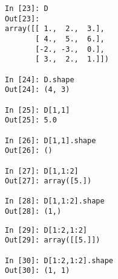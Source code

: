 \begin{center}
    \begin{minipage}{0.3\textwidth}
    \begin{verbatim}
In [23]: D
Out[23]: 
array([[ 1.,  2.,  3.],
       [ 4.,  5.,  6.],
       [-2., -3.,  0.],
       [ 3.,  2.,  1.]])

In [24]: D.shape
Out[24]: (4, 3)

In [25]: D[1,1]
Out[25]: 5.0

In [26]: D[1,1].shape
Out[26]: ()

In [27]: D[1,1:2]
Out[27]: array([5.])

In [28]: D[1,1:2].shape
Out[28]: (1,)
\end{verbatim}
\end{minipage}
\end{center}
\begin{center}
    \begin{minipage}{0.3\textwidth}
    \begin{verbatim}
In [29]: D[1:2,1:2]
Out[29]: array([[5.]])

In [30]: D[1:2,1:2].shape
Out[30]: (1, 1)
    \end{verbatim}
        
    \end{minipage}
\end{center}

